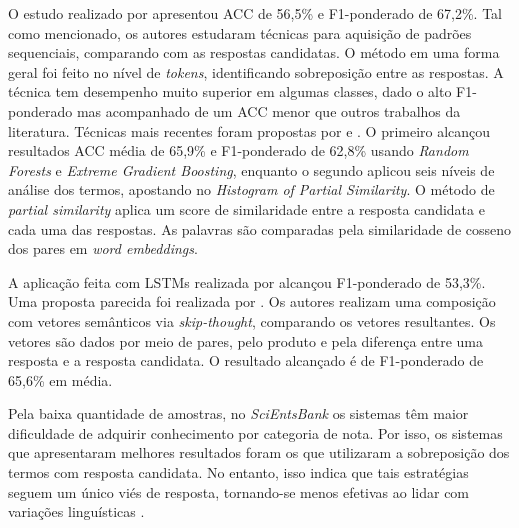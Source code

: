O estudo realizado por \cite{roy2016} apresentou ACC de 56,5\% e F1-ponderado de 67,2\%. Tal como mencionado, os autores estudaram técnicas para aquisição de padrões sequenciais, comparando com as respostas candidatas. O método em uma forma geral foi feito no nível de \textit{tokens}, identificando sobreposição entre as respostas. A técnica tem desempenho muito superior em algumas classes, dado o alto F1-ponderado mas acompanhado de um ACC menor que outros trabalhos da literatura. Técnicas mais recentes foram propostas por \cite{galhardi2018c} e \cite{saha2018}. O primeiro alcançou resultados ACC média de 65,9\% e F1-ponderado de 62,8\% usando \textit{Random Forests} e \textit{Extreme Gradient Boosting}, enquanto o segundo aplicou seis níveis de análise dos termos, apostando no \textit{Histogram of Partial Similarity}. O método de \textit{partial similarity} aplica um score de similaridade entre a resposta candidata e cada uma das respostas. As palavras são comparadas pela similaridade de cosseno dos pares em \textit{word embeddings}. 

A aplicação feita com LSTMs realizada por \cite{riordan2017} alcançou F1-ponderado de 53,3\%. Uma proposta parecida foi realizada por \cite{gomaa2019}. Os autores realizam uma composição com vetores semânticos via \textit{skip-thought}, comparando os vetores resultantes. Os vetores são dados por meio de pares, pelo produto e pela diferença entre uma resposta e a resposta candidata. O resultado alcançado é de F1-ponderado de 65,6\% em média. 

Pela baixa quantidade de amostras, no \textit{SciEntsBank} os sistemas têm maior dificuldade de adquirir conhecimento por categoria de nota. Por isso, os sistemas que apresentaram melhores resultados foram os que utilizaram a sobreposição dos termos com resposta candidata. No entanto, isso indica que tais estratégias seguem um único viés de resposta, tornando-se menos efetivas ao lidar com variações linguísticas \cite{filighera2020}.

